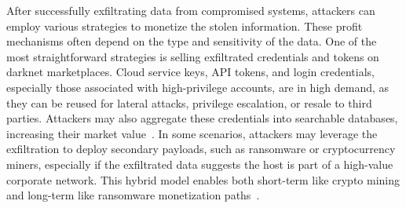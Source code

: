 \begin{itemize}
\end{itemize}

After successfully exfiltrating data from compromised systems, attackers can employ various strategies to monetize the stolen information. These profit mechanisms often depend on the type and sensitivity of the data.
One of the most straightforward strategies is selling exfiltrated credentials and tokens on darknet marketplaces. Cloud service keys, API tokens, and login credentials, especially those associated with high-privilege accounts, are in high demand, as they can be reused for lateral attacks, privilege escalation, or resale to third parties. Attackers may also aggregate these credentials into searchable databases, increasing their market value~\cite{DarkOwl2022}.
In some scenarios, attackers may leverage the exfiltration to deploy secondary payloads, such as ransomware or cryptocurrency miners, especially if the exfiltrated data suggests the host is part of a high-value corporate network. This hybrid model enables both short-term like crypto mining and long-term like ransomware monetization paths~\cite{GoogleCloud2021}.


